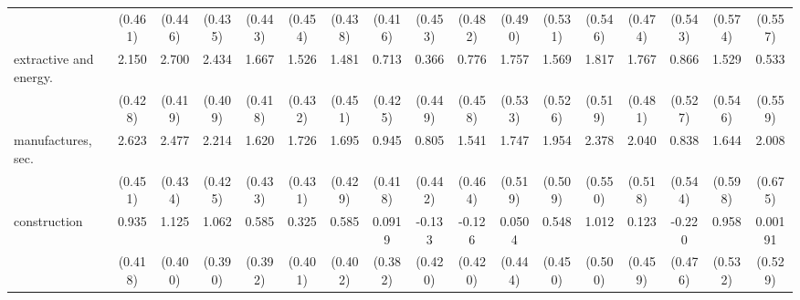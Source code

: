 {\begin{tabular}{l*{16}{c}}
                    &     (0.461)         &     (0.446)         &     (0.435)         &     (0.443)         &     (0.454)         &     (0.438)         &     (0.416)         &     (0.453)         &     (0.482)         &     (0.490)         &     (0.531)         &     (0.546)         &     (0.474)         &     (0.543)         &     (0.574)         &     (0.557)         \\
[1em]
extractive and energy.&       2.150\sym{***}&       2.700\sym{***}&       2.434\sym{***}&       1.667\sym{***}&       1.526\sym{***}&       1.481\sym{**} &       0.713         &       0.366         &       0.776         &       1.757\sym{***}&       1.569\sym{**} &       1.817\sym{***}&       1.767\sym{***}&       0.866         &       1.529\sym{**} &       0.533         \\
                    &     (0.428)         &     (0.419)         &     (0.409)         &     (0.418)         &     (0.432)         &     (0.451)         &     (0.425)         &     (0.449)         &     (0.458)         &     (0.533)         &     (0.526)         &     (0.519)         &     (0.481)         &     (0.527)         &     (0.546)         &     (0.559)         \\
[1em]
manufactures, sec.  &       2.623\sym{***}&       2.477\sym{***}&       2.214\sym{***}&       1.620\sym{***}&       1.726\sym{***}&       1.695\sym{***}&       0.945\sym{*}  &       0.805         &       1.541\sym{***}&       1.747\sym{***}&       1.954\sym{***}&       2.378\sym{***}&       2.040\sym{***}&       0.838         &       1.644\sym{**} &       2.008\sym{**} \\
                    &     (0.451)         &     (0.434)         &     (0.425)         &     (0.433)         &     (0.431)         &     (0.429)         &     (0.418)         &     (0.442)         &     (0.464)         &     (0.519)         &     (0.509)         &     (0.550)         &     (0.518)         &     (0.544)         &     (0.598)         &     (0.675)         \\
[1em]
construction        &       0.935\sym{*}  &       1.125\sym{**} &       1.062\sym{**} &       0.585         &       0.325         &       0.585         &      0.0919         &      -0.133         &      -0.126         &      0.0504         &       0.548         &       1.012\sym{*}  &       0.123         &      -0.220         &       0.958         &     0.00191         \\
                    &     (0.418)         &     (0.400)         &     (0.390)         &     (0.392)         &     (0.401)         &     (0.402)         &     (0.382)         &     (0.420)         &     (0.420)         &     (0.444)         &     (0.450)         &     (0.500)         &     (0.459)         &     (0.476)         &     (0.532)         &     (0.529)         \\

\end{tabular}}
